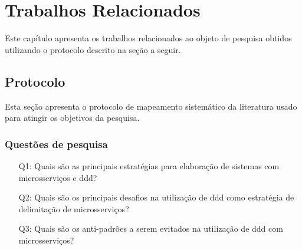 \chapter{Trabalhos Relacionados}
\label{cap:trabalhos}
Este capítulo apresenta os trabalhos relacionados ao objeto de pesquisa obtidos utilizando o protocolo descrito na seção a seguir.

\section{Protocolo}
Esta seção apresenta o protocolo de mapeamento sistemático da literatura usado para atingir os objetivos da pesquisa.

\subsection{Questões de pesquisa}
\label{section:questoes_pesquisa}
\begin{enumerate}
    \item[Q1:] Quais são as principais estratégias para elaboração de sistemas com microsserviços e \acrshort{ddd}?
    \item[Q2:] Quais são os principais desafios na utilização de \acrshort{ddd} como estratégia de delimitação de microsserviços?
    \item[Q3:] Quais são os anti-padrões a serem evitados na utilização de \acrshort{ddd} com microsserviços?
    
\end{enumerate}

